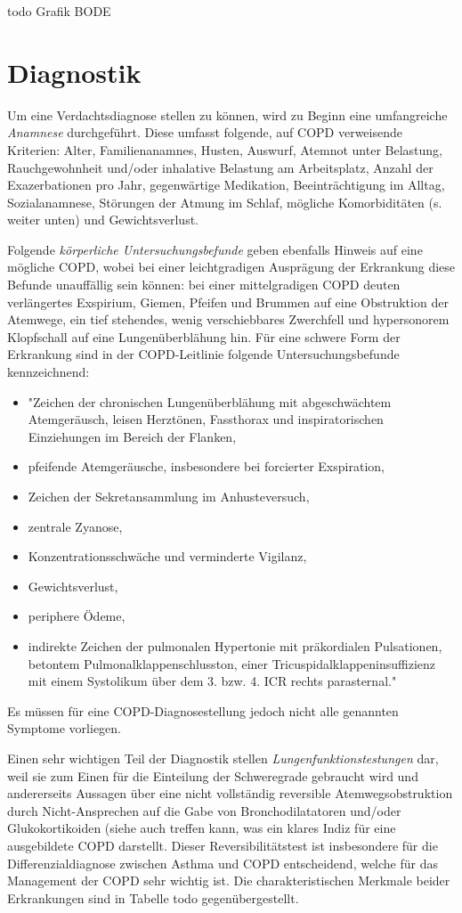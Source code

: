 todo Grafik BODE

\section{Diagnostik}
\label{diagnostik}
Um eine Verdachtsdiagnose stellen zu können, wird zu Beginn eine umfangreiche \emph{Anamnese} durchgeführt. Diese umfasst folgende, auf COPD verweisende Kriterien: Alter, Familienanamnes, Husten, Auswurf, Atemnot unter Belastung, Rauchgewohnheit und/oder inhalative Belastung am Arbeitsplatz, Anzahl der Exazerbationen pro Jahr, gegenwärtige Medikation, Beeinträchtigung im Alltag, Sozialanamnese, Störungen der Atmung im Schlaf, mögliche Komorbiditäten (s. weiter unten) und Gewichtsverlust. 

Folgende \emph{körperliche Untersuchungsbefunde} geben ebenfalls Hinweis auf eine mögliche COPD, wobei bei einer leichtgradigen Ausprägung der Erkrankung diese Befunde unauffällig sein können: bei einer mittelgradigen COPD deuten verlängertes Exspirium, Giemen, Pfeifen und Brummen auf eine Obstruktion der Atemwege, ein tief stehendes, wenig verschiebbares Zwerchfell und hypersonorem Klopfschall auf eine Lungenüberblähung hin. Für eine schwere Form der Erkrankung sind in der COPD-Leitlinie folgende Untersuchungsbefunde kennzeichnend:
\begin{itemize}
\item "Zeichen der chronischen Lungenüberblähung mit abgeschwächtem Atemgeräusch, leisen Herztönen, Fassthorax und inspiratorischen Einziehungen im Bereich der Flanken,
\item pfeifende Atemgeräusche, insbesondere bei forcierter Exspiration,
\item Zeichen der Sekretansammlung im Anhusteversuch,
\item zentrale Zyanose,
\item Konzentrationsschwäche und verminderte Vigilanz,
\item Gewichtsverlust,
\item periphere Ödeme,
\item indirekte Zeichen der pulmonalen Hypertonie mit präkordialen Pulsationen, betontem Pulmonalklappenschlusston, einer Tricuspidalklappeninsuffizienz mit einem Systolikum über
dem 3. bzw. 4. ICR rechts parasternal." \autocite[e6]{vogelmeier2007}
\end{itemize}
Es müssen für eine COPD-Diagnosestellung jedoch nicht alle genannten Symptome vorliegen.

Einen sehr wichtigen Teil der Diagnostik stellen \emph{Lungenfunktionstestungen} dar, weil sie zum Einen für die Einteilung der Schweregrade gebraucht wird und andererseits Aussagen über eine nicht vollständig reversible Atemwegsobstruktion durch Nicht-Ansprechen auf die Gabe von Bronchodilatatoren und/oder Glukokortikoiden (siehe auch \label{medikamentoese therapien} treffen kann, was ein klares Indiz für eine ausgebildete COPD darstellt. Dieser Reversibilitätstest ist insbesondere für die Differenzialdiagnose zwischen Asthma und COPD entscheidend, welche für das Management der COPD sehr wichtig ist. Die charakteristischen Merkmale beider Erkrankungen sind in Tabelle todo gegenübergestellt.

